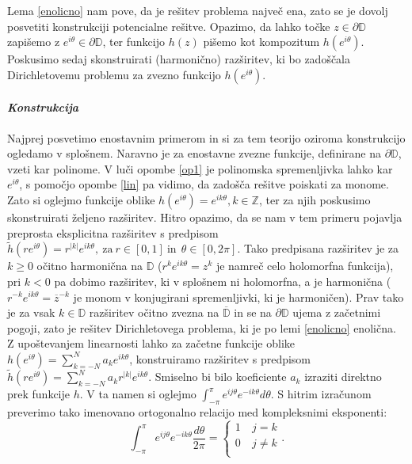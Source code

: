 \documentclass[mat1]{fmfdelo}
\begin{document}
    \begin{opomba}
        \label{op1}
        Lema \ref{enolicno} nam pove, da je rešitev problema največ ena, zato se je dovolj posvetiti konstrukciji potencialne rešitve. 
        Opazimo, da lahko točke $z \in \partial \mathbb{D}$ zapišemo z $e^{i \theta} \in \partial \mathbb{D}$, ter funkcijo $h(z)$ pišemo kot kompozitum $h(e^{i \theta})$.
        Poskusimo sedaj skonstruirati (harmonično) razširitev, ki bo zadoščala Dirichletovemu problemu za zvezno funkcijo $h(e^{i \theta})$.
    \end{opomba}

    \paragraph[short]{\emph{Konstrukcija}}
    Najprej posvetimo enostavnim primerom in si za tem teorijo oziroma konstrukcijo ogledamo v splošnem. 
    Naravno je za enostavne zvezne funkcije, definirane na $\partial \mathbb{D}$, vzeti kar polinome. V luči opombe \ref{op1} je polinomska spremenljivka lahko kar $e^{i\theta}$, s pomočjo opombe \ref{lin} pa vidimo, da zadošča rešitve poiskati za monome. 
    Zato si oglejmo funkcije oblike $h(e^{i \theta}) = e^{i k \theta}, k \in \mathbb{Z}$, ter za njih poskusimo skonstruirati željeno razširitev. 
    Hitro opazimo, da se nam v tem primeru pojavlja preprosta eksplicitna razširitev s predpisom $\widetilde{h}(r e^{i \theta}) = r^{|k|}e^{i k \theta},~\text{za}~r\in [0, 1]~\text{in}~~\theta \in [0, 2\pi]$. 
    Tako predpisana razširitev je za $k \geq 0$ očitno harmonična na $\mathbb{D}$ ($r^k e^{ik\theta} = z^k$ je namreč celo holomorfna funkcija), pri $k < 0$ pa dobimo razširitev, ki v splošnem ni holomorfna, a je harmonična ($r^{-k} e^{ik\theta} = \overline{z}^{-k}$ je monom v konjugirani spremenljivki, ki je harmoničen).
    Prav tako je za vsak $k \in \mathbb{D}$ razširitev očitno zvezna na $\overline{\mathbb{D}}$ in se na $\partial \mathbb{D}$ ujema z začetnimi pogoji, zato je rešitev Dirichletovega problema, ki je po lemi \ref{enolicno} enolična. 
    Z upoštevanjem linearnosti lahko za začetne funkcije oblike $h(e^{i\theta}) = \sum_{k = -N}^{N}{a_k e^{ik\theta}}$, konstruiramo razširitev s predpisom
    $\widetilde{h}(r e^{i \theta}) = \sum_{k = -N}^{N}{a_k r^{|k|}e^{ik\theta}}$. Smiselno bi bilo koeficiente $a_k$ izraziti direktno prek funkcije $h$. 
    V ta namen si oglejmo $\int_{-\pi}^{\pi}{e^{ij\theta} e^{-ik\theta}d\theta}$. S hitrim izračunom preverimo tako imenovano ortogonalno relacijo med kompleksnimi eksponenti:
        $$
        \int_{-\pi}^{\pi}{e^{ij\theta} e^{-ik\theta}\frac{d\theta}{2\pi}} = 
        \begin{cases}
            1~&j=k\\
            0~&j \neq k\\
        \end{cases}
        .$$
\end{document}
